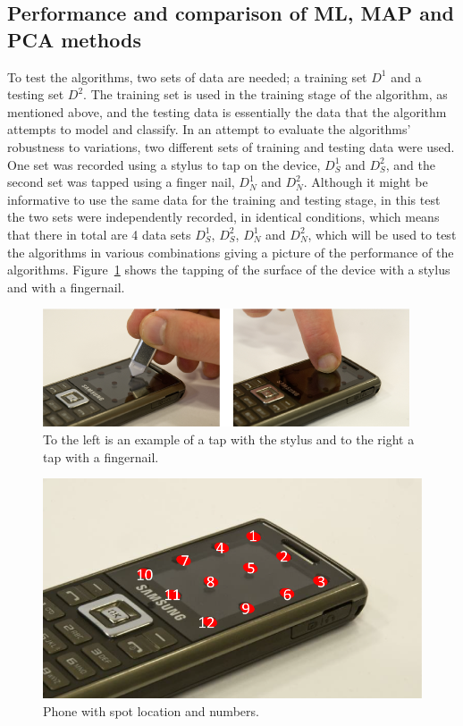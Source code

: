 \subsection{Performance and comparison of ML, MAP and PCA methods}
To test the algorithms, two sets of data are needed; a training set $D^1$ and a testing set $D^2$. The training set is used in the training stage of the algorithm, as mentioned above, and the testing data is essentially the data that the algorithm attempts to model and classify. In an attempt to evaluate the algorithms' robustness to variations, two different sets of training and testing data were used. One set was recorded using a stylus to tap on the device, $D^1_S$ and $D^2_S$, and the second set was tapped using a finger nail, $D^1_N$ and $D^2_N$. Although it might be informative to use the same data for the training and testing stage, in this test the two sets were independently recorded, in identical conditions, which means that there in total are 4 data sets $D^1_S$, $D^2_S$, $D^1_N$ and $D^2_N$, which will be used to test the algorithms in various combinations giving a picture of the performance of the algorithms. Figure~\ref{fig:tapSN} shows the tapping of the surface of the device with a stylus and with a fingernail.

\begin{figure}[!]
\centering
\includegraphics[width=410 px]{tapSN.png}
\caption{To the left is an example of a tap with the stylus and to the right a tap with a fingernail.}\label{fig:tapSN}
\end{figure}

\begin{figure}[!]
\centering
\includegraphics[width=300 px]{phoneDisplayNum.png}
\caption{Phone with spot location and numbers.}\label{fig:phoneDisplayNum}
\end{figure}

